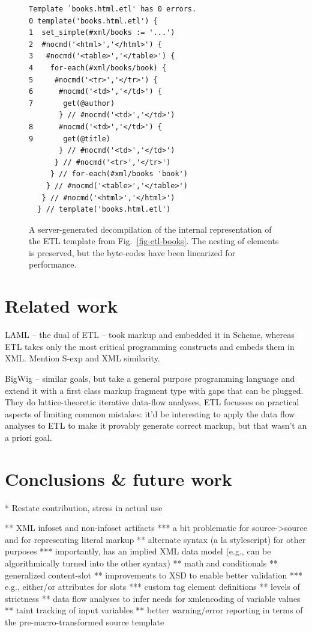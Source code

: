 \documentclass{www2003-submission}
\newcommand{\figref}[1]{Fig.~\ref{fig-#1}}
\begin{document}
\begin{figure}[htbp]
\begin{verbatim}
Template `books.html.etl' has 0 errors.
0 template('books.html.etl') {
1  set_simple(#xml/books := '...')
2  #nocmd('<html>','</html>') {
3   #nocmd('<table>','</table>') {
4    for-each(#xml/books/book) {
5     #nocmd('<tr>','</tr>') {
6      #nocmd('<td>','</td>') {
7       get(@author)
       } // #nocmd('<td>','</td>')
8      #nocmd('<td>','</td>') {
9       get(@title)
       } // #nocmd('<td>','</td>')
      } // #nocmd('<tr>','</tr>')
     } // for-each(#xml/books 'book')
    } // #nocmd('<table>','</table>')
   } // #nocmd('<html>','</html>')
  } // template('books.html.etl')
\end{verbatim}
\caption{A server-generated decompilation of the internal representation
of the ETL template from \figref{etl-books}.  The nesting of elements
is preserved, but the byte-codes have been linearized for performance.
\label{fig-etl-decompile}}
\end{figure}


\section{Related work}
\label{sec-related-work}

LAML -- the dual of ETL -- took markup and embedded it in Scheme,
whereas ETL takes only the most critical programming constructs and
embeds them in XML.  Mention S-exp and XML similarity.

BigWig -- similar goals, but take a general purpose programming
language and extend it with a first class markup fragment type with
gaps that can be plugged.  They do lattice-theoretic iterative
data-flow analyses, ETL focusses on practical aspects of limiting
common mistakes:  it'd be interesting to apply the data flow analyses
to ETL to make it provably generate correct markup, but that wasn't an
a priori goal.


\section{Conclusions \& future work}
\label{sec-conclusion}

* Restate contribution, stress in actual use


** XML infoset and non-infoset artifacts
*** a bit problematic for source->source and for representing literal markup
** alternate syntax (a la stylescript) for other purposes
*** importantly, has an implied XML data model (e.g., can be algorithmically turned into the other syntax)
** math and conditionals
** generalized content-slot
** improvements to XSD to enable better validation
*** e.g., either/or attributes for slots
*** custom tag element definitions
** levels of strictness
** data flow analyses to infer needs for xmlencoding of variable values
** taint tracking of input variables
** better warning/error reporting in terms of the pre-macro-transformed source template
\end{document}
